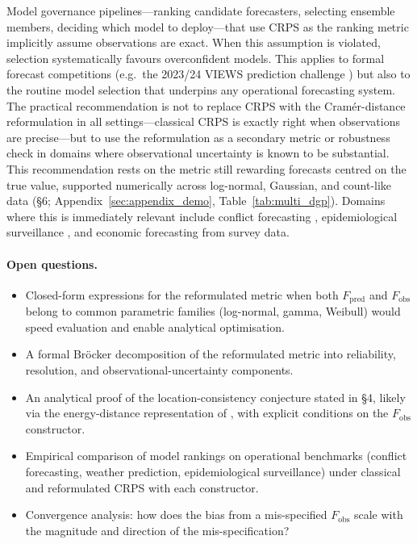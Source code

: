 Model governance pipelines---ranking candidate forecasters, selecting ensemble members, deciding which model to deploy---that use CRPS as the ranking metric implicitly assume observations are exact. When this assumption is violated, selection systematically favours overconfident models. This applies to formal forecast competitions (e.g.\ the 2023/24 VIEWS prediction challenge \citep{hegre2025prediction}) but also to the routine model selection that underpins any operational forecasting system. The practical recommendation is not to replace CRPS with the Cram\'er-distance reformulation in all settings---classical CRPS is exactly right when observations are precise---but to use the reformulation as a secondary metric or robustness check in domains where observational uncertainty is known to be substantial. This recommendation rests on the metric still rewarding forecasts centred on the true value, supported numerically across log-normal, Gaussian, and count-like data (\S6; Appendix~\ref{sec:appendix_demo}, Table~\ref{tab:multi_dgp}). Domains where this is immediately relevant include conflict forecasting \citep{hegre2019views,ucdp_codebook}, epidemiological surveillance \citep{gibbons2014measuring}, and economic forecasting from survey data.

\paragraph{Open questions.}
\begin{itemize}
    \item Closed-form expressions for the reformulated metric when both $F_\text{pred}$ and $F_\text{obs}$ belong to common parametric families (log-normal, gamma, Weibull) would speed evaluation and enable analytical optimisation.
    \item A formal Br\"ocker decomposition of the reformulated metric into reliability, resolution, and observational-uncertainty components.
    \item An analytical proof of the location-consistency conjecture stated in \S4, likely via the energy-distance representation of \citet{szekely2013energy}, with explicit conditions on the $F_\text{obs}$ constructor.
    \item Empirical comparison of model rankings on operational benchmarks (conflict forecasting, weather prediction, epidemiological surveillance) under classical and reformulated CRPS with each constructor.
    \item Convergence analysis: how does the bias from a mis-specified $F_\text{obs}$ scale with the magnitude and direction of the mis-specification?
\end{itemize}
